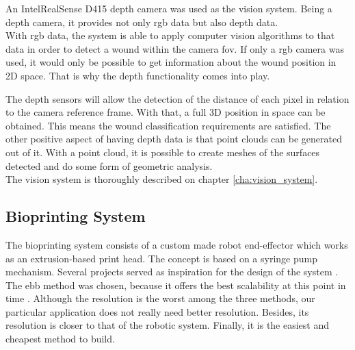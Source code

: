 An Intel\textregistered RealSense\texttrademark{} D415 depth camera was used as the vision system. Being a depth camera, it provides not only \gls{rgb} data but also depth data.\\

With \gls{rgb} data, the system is able to apply computer vision algorithms to that data in order to detect a wound within the camera \gls{fov}. If only a \gls{rgb} camera was used, it would only be possible to get information about the wound position in 2D space. That is why the depth functionality comes into play.

The depth sensors will allow the detection of the distance of each pixel in relation to the camera reference frame. With that, a full 3D position in space can be obtained. This means the wound classification requirements are satisfied. The other positive aspect of having depth data is that point clouds can be generated out of it. With a point cloud, it is possible to create meshes of the surfaces detected and do some form of geometric analysis.\\

The vision system is thoroughly described on chapter \ref{cha:vision_system}.


\subsection*{Bioprinting System}
\label{subsec:system_architecture_components_bioprinting_system}

The bioprinting system consists of a custom made robot end-effector which works as an extrusion-based print head. The concept is based on a syringe pump mechanism. Several projects served as inspiration for the design of the system \cite{Wijnen2014_open_source_syring_pump_library,Pusch2018_large_volume_syringe_pump_extruder_desktop_3d_printers,Booeshaghi2019_principles_open_source_bioinstrumentation_poseidon}.\\

The \gls{ebb} method was chosen, because it offers the best scalability at this point in time \cite{Vijayavenkataraman2018_bioprinting_tissues_organs_regen_med}. Although the resolution is the worst among the three methods, our particular application does not really need better resolution. Besides, its resolution is closer to that of the robotic system. Finally, it is the easiest and cheapest method to build.

